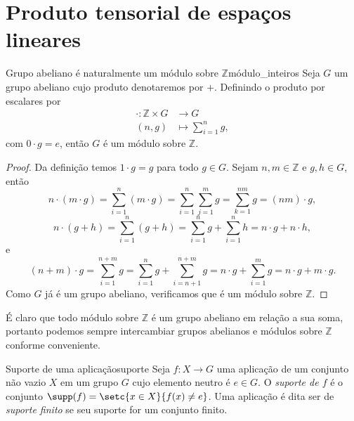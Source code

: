 \section{Produto tensorial de espaços lineares}
\begin{lemma}{Grupo abeliano é naturalmente um módulo sobre \(\mathbb{Z}\)}{módulo_inteiros}
    Seja \(G\) um grupo abeliano cujo produto denotaremos por \(+\). Definindo o produto por escalares por
    \begin{align*}
        \cdot : \mathbb{Z} \times G &\to G\\
                               (n,g)&\mapsto \sum_{i = 1}^n g,
    \end{align*}
    com \(0\cdot g = e\), então \(G\) é um módulo sobre \(\mathbb{Z}\).
\end{lemma}
\begin{proof}
    Da definição temos \(1\cdot g = g\) para todo \(g \in G\). Sejam \(n, m \in \mathbb{Z}\) e \(g, h \in G\), então
    \begin{equation*}
        n\cdot(m \cdot g) = \sum_{i = 1}^n (m \cdot g) = \sum_{i = 1}^n \sum_{j = 1}^m g = \sum_{k = 1}^{nm} g = (nm)\cdot g,
    \end{equation*}
    \begin{equation*}
        n\cdot(g + h) = \sum_{i = 1}^n (g + h) = \sum_{i = 1}^n g + \sum_{i = 1}^{n} h = n\cdot g + n \cdot h,
    \end{equation*}
    e
    \begin{equation*}
        (n + m)\cdot g = \sum_{i = 1}^{n + m} g = \sum_{i = 1}^n g + \sum_{i = n+1}^{n + m} g = n \cdot g + \sum_{i = 1}^m g = n\cdot g + m \cdot g.
    \end{equation*}
    Como \(G\) já é um grupo abeliano, verificamos que é um módulo sobre \(\mathbb{Z}\).
\end{proof}
\begin{remark}
    É claro que todo módulo sobre \(\mathbb{Z}\) é um grupo abeliano em relação a sua soma, portanto podemos sempre intercambiar grupos abelianos e módulos sobre \(\mathbb{Z}\) conforme conveniente.
\end{remark}

\begin{definition}{Suporte de uma aplicação}{suporte}
    Seja \(f : X \to G\) uma aplicação de um conjunto não vazio \(X\) em um grupo \(G\) cujo elemento neutro é \(e \in G\). O \emph{suporte de \(f\)} é o conjunto \(\supp(f) = \setc{x \in X}{f(x) \neq e}\). Uma aplicação é dita ser de \emph{suporte finito} se seu suporte for um conjunto finito.
\end{definition}

